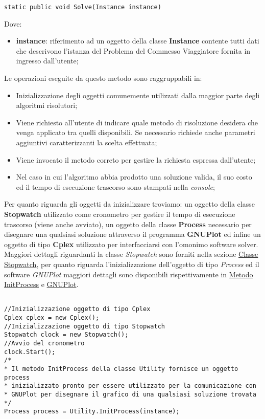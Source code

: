 \documentclass[11pt]{article}
\begin{document}
\begin{lstlisting}
static public void Solve(Instance instance)
\end{lstlisting}

Dove:

\begin{itemize}
\item \textbf{instance}: riferimento ad un oggetto della classe \textbf{Instance} contente tutti dati che descrivono l'istanza del Problema del Commesso Viaggiatore fornita in ingresso dall'utente;
\end{itemize}

Le operazioni eseguite da questo metodo sono raggruppabili in:

\begin{itemize}
    \item Inizializzazione degli oggetti comunemente utilizzati dalla maggior parte degli algoritmi risolutori;
    \item Viene richiesto all'utente di indicare quale metodo di risoluzione desidera che venga applicato tra quelli disponibili. Se necessario richiede anche parametri aggiuntivi caratterizzanti la scelta effettuata;
    \item Viene invocato il metodo correto per gestire la richiesta espressa dall'utente;
    \item Nel caso in cui l'algoritmo abbia prodotto una soluzione valida, il suo costo ed il tempo di esecuzione trascorso sono stampati nella \textit{console};
\end{itemize}

Per quanto riguarda gli oggetti da inizializzare troviamo: un oggetto della classe \textbf{Stopwatch} utilizzato come cronometro per gestire il tempo di esecuzione trascorso (viene anche avviato), un oggetto della classe \textbf{Process} necessario per disegnare una qualsiasi soluzione attraverso il programma \textbf{GNUPlot} ed infine un oggetto di tipo \textbf{Cplex} utilizzato per interfacciarsi con l'omonimo software solver. Maggiori dettagli riguardanti la classe \textit{Stopwatch} sono forniti nella sezione \hyperref[sec:StopwatchS]{Classe Stopwatch}, per quanto riguarda l'inizializzazione dell'oggetto di tipo \textit{Process} ed il software \textit{GNUPlot} maggiori dettagli sono disponibili rispettivamente in \hyperref[sec:InitProcessS]{Metodo InitProcess} e \hyperref[sec:GNUPlotS]{GNUPlot}.

\begin{lstlisting}

//Inizializzazione oggetto di tipo Cplex
Cplex cplex = new Cplex();
//Inizializzazione oggetto di tipo Stopwatch
Stopwatch clock = new Stopwatch();
//Avvio del cronometro
clock.Start();
/*
* Il metodo InitProcess della classe Utility fornisce un oggetto process
* inizializzato pronto per essere utilizzato per la comunicazione con
* GNUPlot per disegnare il grafico di una qualsiasi soluzione trovata
*/
Process process = Utility.InitProcess(instance);

\end{lstlisting}
\end{document}
